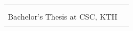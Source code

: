 \documentclass{a0poster}
\begin{document}
\begin{tabular}{ll}

  \begin{minipage}{425mm}

    {\Huge\bf Probabilistic Tracking of Multiple Rodent Whiskers In Monocular Video Sequences}\\[10mm]
    {\Large\bf Jim Holmström, \; Emil Lundberg\\[3mm]
      Bachelor's Thesis at CSC, KTH} \\


    \vspace*{5mm}

  \end{minipage}

\end{tabular}

\vspace*{25mm}

\begin{minipage}{\linewidth}

  \begin{multicols*}{2}
    
    
    
    
    
    

    
    
    

    
    

  \end{multicols*}

\end{minipage}
\end{document}
